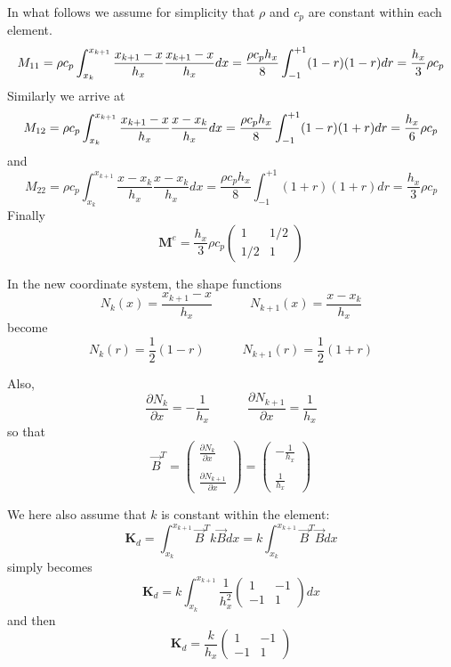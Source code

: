 In what follows we assume for simplicity that $\rho$ and $c_p$ are constant within each element.
\[
M_{11}=
\rho c_p
\int_{\tiny x_k}^{x_{k+1}} 
\frac{x_{k+1}-x}{h_x}  
\frac{x_{k+1}-x}{h_x}  
dx
=  \frac{\rho c_p h_x}{8} \int_{-1}^{+1} (1-r) (1-r)  dr  = \frac{h_x}{3} \rho c_p
\]
Similarly we arrive at 
\begin{eqnarray}
M_{12}
=\rho c_p 
\int_{x_k}^{x_{k+1}} 
\frac{x_{k+1}-x}{h_x}  
\frac{x-x_k}{h_x}  
dx
=
\frac{\rho c_p  h_x}{8} 
\int_{-1}^{+1} (1-r) (1+r)dr
= \frac{h_x}{6} \rho c_p \nonumber
\end{eqnarray}
and 
\[
M_{22}
=
\rho c_p 
\int_{x_k}^{x_{k+1}} 
\frac{x-x_k}{h_x}  
\frac{x-x_k}{h_x}  
dx
=
\frac{\rho c_p  h_x}{8} 
\int_{-1}^{+1} (1+r) (1+r)dr
= \frac{h_x}{3} \rho c_p 
\]
Finally 
\[
\boxed{
{\bm M}^e= \frac{h_x}{3} \rho c_p  
\left(
\begin{array}{cc}
1  & 1/2 \\
1/2 & 1
\end{array}
\right)
}
\]

In the new coordinate system, the {\color{olive}shape functions} 
\[
N_k(x) = \frac{x_{k+1}-x}{h_x} 
\quad
\quad
\quad
N_{k+1}(x) = \frac{x-x_k}{h_x} 
\]
become 
\[
N_k(r) = \frac{1}{2} (1-r)
\quad
\quad
\quad
N_{k+1}(r) = \frac{1}{2} (1+r)
\]

Also, 
\[
\frac{\partial N_k}{\partial x} = - \frac{1}{h_x} 
\quad
\quad
\quad
\frac{\partial N_{k+1}}{\partial x} = \frac{1}{h_x} 
\]
so that 
\[
{\vec B}^T=
\left(
\begin{array}{cc}
 \frac{\partial N_k}{\partial x}   \\ \\
 \frac{\partial N_{k+1}}{\partial x}
\end{array}
\right)
=
\left(
\begin{array}{cc}
-\frac{1}{h_x} \\ \\
\frac{1}{h_x} 
\end{array}
\right)
\]


We here also assume that $k$ is constant within the element:
\[
{\bm K}_d =
\int_{x_k}^{x_{k+1}}   {\vec B}^T k {\vec B} dx 
= k \int_{x_k}^{x_{k+1}}   {\vec B}^T {\vec B} dx 
\]
simply becomes
\[
{\bm K}_d = k
 \int_{x_k}^{x_{k+1}} 
\frac{1}{h_x^2}
\left(
\begin{array}{cc}
1 & -1 \\ -1 & 1
\end{array}
\right)
dx
\]
and then
\[
\boxed{
{\bm K}_d =
\frac{k}{h_x}
\left(
\begin{array}{cc}
1 & -1 \\ -1 & 1
\end{array}
\right)
}
\]

